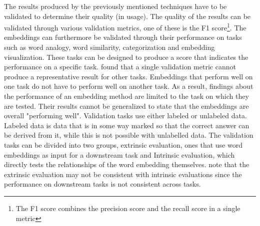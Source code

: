 \documentclass[../../Thesis.tex]{subfiles}
\begin{document}
The results produced by the previously mentioned techniques have to be validated to determine their quality (in usage). The quality of the results can be validated through various validation metrics, one of these is the F1 score\footnote{The F1 score combines the precision score and the recall score in a single metric}. The embeddings can furthermore be validated through their performance on tasks such as word analogy, word similarity, categorization and embedding visualization. These tasks can be designed to produce a score that indicates the performance on a specific task. \citet{schnabel2015evaluation} found that a single validation metric cannot produce a representative result for other tasks. Embeddings that perform well on one task do not have to perform well on another task. As a result, findings about the performance of an embedding method are limited to the task on which they are tested. Their results cannot be generalized to state that the embeddings are overall "performing well". Validation tasks use either labeled or unlabeled data. Labeled data is data that is in some way marked so that the correct answer can be derived from it, while this is not possible with unlabelled data. The validation tasks can be divided into two groups, extrinsic evaluation, ones that use word embeddings as input for a downstream task and Intrinsic evaluation, which directly tests the relationships of the word embedding themselves. \citet{schnabel2015evaluation} note that the extrinsic evaluation may not be consistent with intrinsic evaluations since the performance on downstream tasks is not consistent across tasks.
\end{document}
